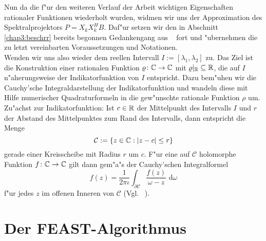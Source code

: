 Nun da die f"ur den weiteren Verlauf der Arbeit wichtigen Eigenschaften rationaler
Funktionen wiederholt wurden, widmen wir uns der Approximation des Spektralprojektors
$P = X_k X_k^H B$. Daf"ur setzen wir den in Abschnitt \ref{chap3:beschrr} bereits begonnen Gedankengang aus ~\cite{ptep}
fort und "ubernehmen die zu letzt vereinbarten Voraussetzungen und Notationen.\\

Wenden wir uns also wieder dem reellen Intervall $I := [\lambda_1, \lambda_2]$ zu. Das Ziel ist
die Konstruktion einer rationalen Funktion $\varrho\colon\mathbb{C}\to\mathbb{C}$ mit $\varrho|_{\mathbb{R}} \subseteq \mathbb{R}$,
die auf $I$ n"aherungsweise der Indikatorfunktion von $I$ entspricht. Dazu
bem"uhen wir die Cauchy'sche Integraldarstellung der Indikatorfunktion und
wandeln diese mit Hilfe numerischer Quadraturformeln in die gew"unschte
rationale Funktion $\rho$ um.\\

Zu"achst zur Indikatorfunktion: Ist $c\in\mathbb{R}$ der Mittelpunkt des Intervalls $I$ und
$r$ der Abstand des Mittelpunktes zum Rand des Intervalls, dann entspricht die Menge
\[
\mathcal{C} := \{z\in\mathbb{C} : |z-c|\le r\}
\]
gerade einer Kreisscheibe mit Radius $r$ um $c$. F"ur eine auf $\mathcal{C}$
holomorphe Funktion $f\colon\mathbb{C}\to\mathbb{C}$ gilt dann gem"a"s der Cauchy'schen Integralformel
\[
f(z) = \frac{1}{2\pi\iota}\int_{\partial \mathcal{C}}\frac{f(z)}{\omega-z}\text{ d}\omega
\]
f"ur jedes $z$ im offenen Inneren von $\mathcal{C}$ (Vgl. ~\cite[20]{jaenich}).

\section{Der FEAST-Algorithmus}
